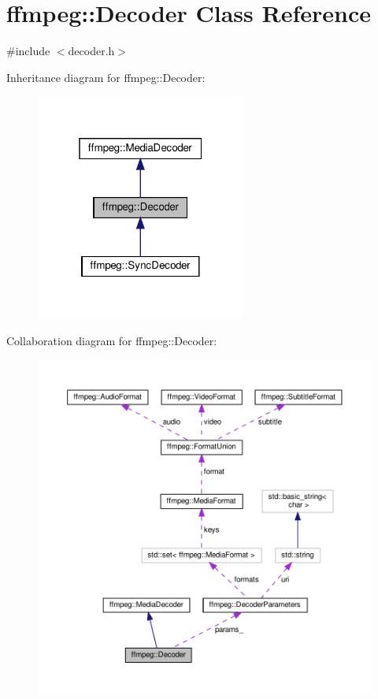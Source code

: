 \hypertarget{classffmpeg_1_1Decoder}{}\section{ffmpeg\+:\+:Decoder Class Reference}
\label{classffmpeg_1_1Decoder}


{\ttfamily \#include $<$decoder.\+h$>$}



Inheritance diagram for ffmpeg\+:\+:Decoder\+:
\nopagebreak
\begin{figure}[H]
\begin{center}
\leavevmode
\includegraphics[width=196pt]{classffmpeg_1_1Decoder__inherit__graph}
\end{center}
\end{figure}


Collaboration diagram for ffmpeg\+:\+:Decoder\+:
\nopagebreak
\begin{figure}[H]
\begin{center}
\leavevmode
\includegraphics[width=350pt]{classffmpeg_1_1Decoder__coll__graph}
\end{center}
\end{figure}
